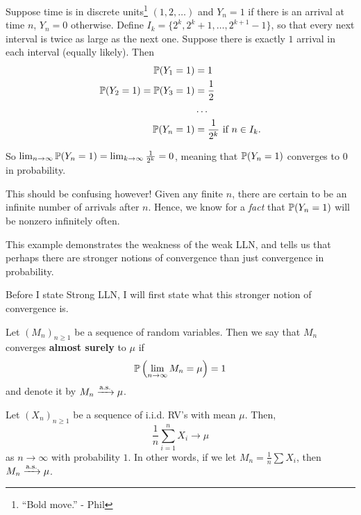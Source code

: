 \documentclass[11 pt]{scrartcl}
\begin{document}
\begin{example}
    Suppose time is in discrete units\footnote{``Bold move.'' - Phil} $(1, 2, \dots )$ and $Y_n = 1$ if there is an arrival at time $n$, $Y_n = 0$ otherwise. Define $I_k = \{2^k, 2^k+1, \dots, 2^{k+1}-1\}$, so that every next interval is twice as large as the next one. 
    Suppose there is exactly $1$ arrival in each interval (equally likely). Then 
    \begin{align*}
        \mathbb P(Y_1 = 1) &= 1 \\ 
        \mathbb P(Y_2 = 1) = \mathbb P(Y_3 = 1) &= \dfrac{1}{2} \\ 
                                    &\dots \\ 
        \mathbb P(Y_n = 1) &= \dfrac{1}{2^k} \text{ if } n \in I_k.
    \end{align*}
    
    So $\lim_{n\to\infty}\mathbb P(Y_n = 1) = \lim_{k\to\infty}\frac{1}{2^k} = 0$, meaning that $\mathbb P(Y_n=1)$ converges to $0$ in probability. 
    
    This should be confusing however! Given any finite $n$, there are certain to be an infinite number of arrivals after $n$. Hence, we know for a \emph{fact} that $\mathbb P(Y_n=1)$ will be nonzero infinitely often. 
    
    This example demonstrates the weakness of the weak LLN, and tells us that perhaps there are stronger notions of convergence than just convergence in probability. 
\end{example}

Before I state Strong LLN, I will first state what this stronger notion of convergence is. 

\begin{definition}
    Let $(M_n)_{n\geq 1}$ be a sequence of random variables. Then we say that $M_n$ converges \textbf{almost surely} to $\mu$ if 
    \[ \mathbb P\left(\lim_{n\to\infty} M_n = \mu\right) = 1\] 
    and denote it by $M_n\xrightarrow{\text{a.s.}} \mu$. 
\end{definition}

\begin{theorem}
    Let $(X_n)_{n\geq 1}$ be a sequence of i.i.d. RV's with mean $\mu$. Then, 
    \[ \dfrac{1}{n}\sum_{i=1}^n X_i \to \mu \] 
    as $n\to\infty$ with probability $1$. In other words, if we let $M_n = \frac{1}{n}\sum X_i$, then $M_n\xrightarrow{\text{a.s.}} \mu$. 
\end{theorem}
\end{document}
